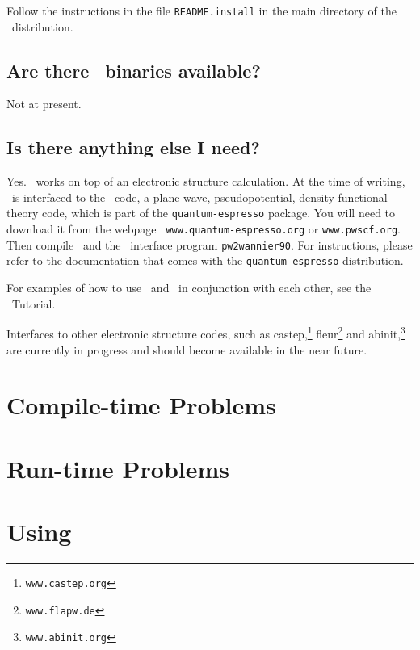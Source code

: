 Follow the instructions in the file {\tt README.install} in the main
directory of the \wannier\ distribution.

\subsection{Are there \wannier\ binaries available?}

Not at present.

\subsection{Is there anything else I need?}

Yes. \wannier\ works on top of an electronic structure
calculation. At the time of writing, \wannier\ is interfaced to the
\pwscf\ code, a plane-wave, pseudopotential, density-functional theory
code, which is part of the {\tt quantum-espresso} package. You 
will need to download it from the webpage {\tt
  www.quantum-espresso.org} or {\tt www.pwscf.org}. Then compile \pwscf\
and the \wannier\ interface program {\tt pw2wannier90}. For
instructions, please refer to the
documentation that comes with the {\tt quantum-espresso} distribution.

For examples of how to use \pwscf\ and \wannier\ in conjunction with
each other, see the \wannier\ Tutorial.

Interfaces to other electronic structure codes, such as {\sc
  castep},\footnote{{\tt www.castep.org}}
{\sc fleur}\footnote{{\tt www.flapw.de}} and {\sc
  abinit},\footnote{{\tt www.abinit.org}} are currently in
progress and should become available in the near future. 

\section{Compile-time Problems}

\section{Run-time Problems}

\section{Using \wannier}